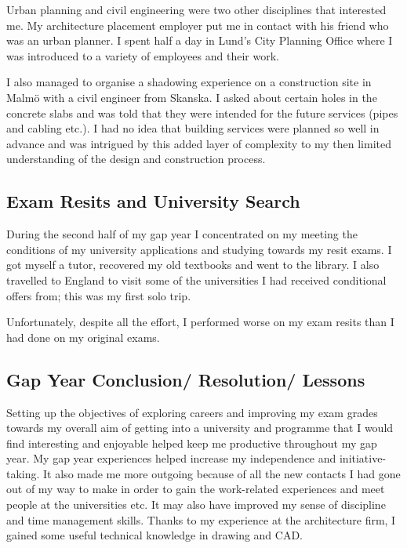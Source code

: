 Urban planning and civil engineering were two other disciplines that interested me.
My architecture placement employer put me in contact with his friend who was an urban planner.
I spent half a day in Lund's City Planning Office where I was introduced to a variety of employees and their work.

I also managed to organise a shadowing experience on a construction site in Malmö with a civil engineer from Skanska.
I asked about certain holes in the concrete slabs and was told that they were intended for the future services (pipes and cabling etc.).
I had no idea that building services were planned so well in advance and was intrigued by this added layer of complexity to my then limited understanding of the design and construction process.




\subsection{Exam Resits and University Search}

During the second half of my gap year I concentrated on my meeting the conditions of my university applications and studying towards my resit exams.
I got myself a tutor, recovered my old textbooks and went to the library.
I also travelled to England to visit some of the universities I had received conditional offers from; this was my first solo trip.

Unfortunately, despite all the effort, I performed worse on my exam resits than I had done on my original exams.



\subsection{Gap Year Conclusion/ Resolution/ Lessons}

Setting up the objectives of exploring careers and improving my exam grades towards my overall aim of getting into a university and programme that I would find interesting and enjoyable helped keep me productive throughout my gap year.
My gap year experiences helped increase my independence and initiative-taking.
It also made me more outgoing because of all the new contacts I had gone out of my way to make in order to gain the work-related experiences and meet people at the universities etc.
It may also have improved my sense of discipline and time management skills.
Thanks to my experience at the architecture firm, I gained some useful technical knowledge in drawing and CAD.

